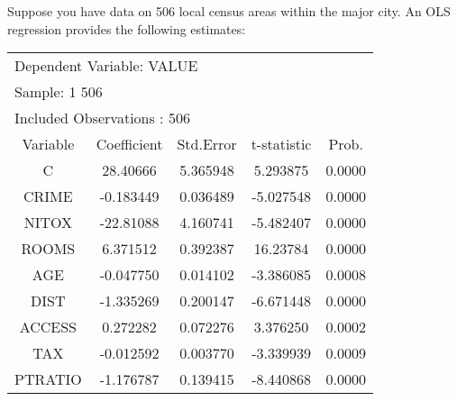\documentclass[12pt,a4paper]{article}
\begin{document}
\noindent Suppose you have data on 506 local census areas within the major city. An OLS regression provides the following estimates:
\begin{center}
\begin{tabular}{c c c c c}\\
\multicolumn{5}{l}{Dependent Variable: VALUE}\\
\multicolumn{5}{l}{Sample: 1 506}\\
\multicolumn{5}{l}{Included Observations : 506}\\ \hline

Variable & Coefficient & Std.Error & t-statistic & Prob. \\ \hline

C & 28.40666 & 5.365948 & 5.293875 & 0.0000 \\

CRIME & -0.183449 & 0.036489 & -5.027548 & 0.0000 \\

NITOX & -22.81088 & 4.160741 & -5.482407 & 0.0000 \\

ROOMS & 6.371512 & 0.392387 & 16.23784 & 0.0000 \\

AGE & -0.047750 & 0.014102 & -3.386085 & 0.0008 \\

DIST & -1.335269 & 0.200147 & -6.671448 & 0.0000 \\

ACCESS & 0.272282 & 0.072276 & 3.376250 & 0.0002 \\

TAX & -0.012592 & 0.003770 & -3.339939 & 0.0009 \\

PTRATIO & -1.176787 & 0.139415 & -8.440868 & 0.0000 \\ \hline
\end{tabular}
\end{center}
\end{document}
